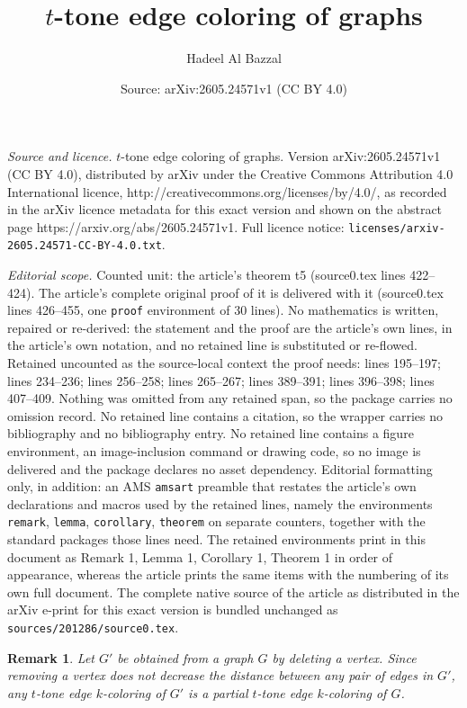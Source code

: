 \documentclass[10pt,a4paper]{amsart}
\title{$t$-tone edge coloring of graphs}
\author{Hadeel Al Bazzal}
\date{Source: arXiv:2605.24571v1 (CC BY 4.0)}
\newtheorem{remark}{Remark}
\begin{document}
\maketitle

\noindent\emph{Source and licence.} $t$-tone edge coloring of graphs. Version arXiv:2605.24571v1 (CC BY 4.0), distributed by arXiv under the Creative Commons Attribution 4.0 International licence, http://creativecommons.org/licenses/by/4.0/, as recorded in the arXiv licence metadata for this exact version and shown on the abstract page https://arxiv.org/abs/2605.24571v1. Full licence notice: \texttt{licenses/arxiv-2605.24571-CC-BY-4.0.txt}.\par\smallskip

\noindent\textit{Editorial scope.} Counted unit: the article's theorem t5 (source0.tex lines 422--424). The article's complete original proof of it is delivered with it (source0.tex lines 426--455, one \texttt{proof} environment of 30 lines). No mathematics is written, repaired or re-derived: the statement and the proof are the article's own lines, in the article's own notation, and no retained line is substituted or re-flowed.  Retained uncounted as the source-local context the proof needs: lines 195--197; lines 234--236; lines 256--258; lines 265--267; lines 389--391; lines 396--398; lines 407--409.  Nothing was omitted from any retained span, so the package carries no omission record.  No retained line contains a citation, so the wrapper carries no bibliography and no bibliography entry.  No retained line contains a figure environment, an image-inclusion command or drawing code, so no image is delivered and the package declares no asset dependency.  Editorial formatting only, in addition: an AMS \texttt{amsart} preamble that restates the article's own declarations and macros used by the retained lines, namely the environments \texttt{remark}, \texttt{lemma}, \texttt{corollary}, \texttt{theorem} on separate counters, together with the standard packages those lines need.  The retained environments print in this document as Remark 1, Lemma 1, Corollary 1, Theorem 1 in order of appearance, whereas the article prints the same items with the numbering of its own full document.  The complete native source of the article as distributed in the arXiv e-print for this exact version is bundled unchanged as \texttt{sources/201286/source0.tex}.
\begin{remark}\label{r1}
 Let $G'$ be obtained from a graph $G$ by deleting a vertex. Since removing a vertex does not decrease the distance between any pair of edges in $G'$, any $t$-tone edge $k$-coloring of $G'$ is a partial $t$-tone edge $k$-coloring of $G$.
\end{remark}
\end{document}
